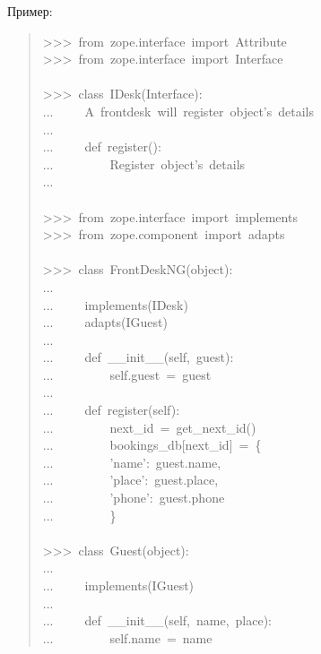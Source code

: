 \documentclass[14pt,a4paper,openany,twoside,final]{extbook}
\begin{document}
Пример:

\begin{quote}{\ttfamily \raggedright \noindent
>{}>{}>~from~zope.interface~import~Attribute\\
>{}>{}>~from~zope.interface~import~Interface\\
~\\
>{}>{}>~class~IDesk(Interface):\\
...~~~~~\textquotedbl{}\textquotedbl{}\textquotedbl{}A~frontdesk~will~register~object's~details\textquotedbl{}\textquotedbl{}\textquotedbl{}\\
...\\
...~~~~~def~register():\\
...~~~~~~~~~\textquotedbl{}\textquotedbl{}\textquotedbl{}Register~object's~details\textquotedbl{}\textquotedbl{}\textquotedbl{}\\
...\\
~\\
>{}>{}>~from~zope.interface~import~implements\\
>{}>{}>~from~zope.component~import~adapts\\
~\\
>{}>{}>~class~FrontDeskNG(object):\\
...\\
...~~~~~implements(IDesk)\\
...~~~~~adapts(IGuest)\\
...\\
...~~~~~def~\_\_init\_\_(self,~guest):\\
...~~~~~~~~~self.guest~=~guest\\
...\\
...~~~~~def~register(self):\\
...~~~~~~~~~next\_id~=~get\_next\_id()\\
...~~~~~~~~~bookings\_db{[}next\_id{]}~=~\{\\
...~~~~~~~~~'name':~guest.name,\\
...~~~~~~~~~'place':~guest.place,\\
...~~~~~~~~~'phone':~guest.phone\\
...~~~~~~~~~\}\\
~\\
>{}>{}>~class~Guest(object):\\
...\\
...~~~~~implements(IGuest)\\
...\\
...~~~~~def~\_\_init\_\_(self,~name,~place):\\
...~~~~~~~~~self.name~=~name\\
}
\end{quote}
\end{document}
